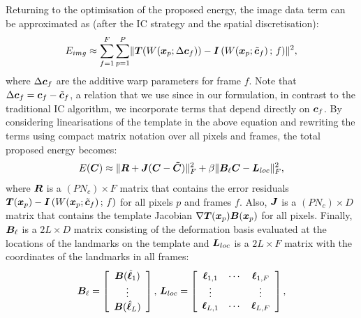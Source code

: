 Returning to the optimisation of the proposed energy, the
image data term can be approximated as (after the IC strategy and the spatial
discretisation):
\begin{equation}
    E_{img} \approx \sum_{f=1}^F \sum_{p=1}^P  \lVert{} 
                                    \boldsymbol{T}(W(\boldsymbol{x}_p;\Delta \boldsymbol{c}_f)) -
                                   \boldsymbol{I}\left( W(\boldsymbol{x}_p;\tilde{\boldsymbol{c}}_f)\,;\, f \right)
                                  \rVert^2,
\end{equation}
where $\Delta \boldsymbol{c}_f$ are the additive warp parameters for frame $f$. 
Note that $\Delta \boldsymbol{c}_f = \boldsymbol{c}_f - \tilde{\boldsymbol{c}}_f$, a relation that we use since
in our formulation, in contrast to the traditional IC algorithm, we incorporate
terms that depend directly on $\boldsymbol{c}_f$.
By considering linearisations of the template in the above equation and rewriting
the terms using compact matrix notation over all pixels and frames, the total
proposed energy becomes:
\begin{equation}\label{E:ENERGY}
    E(\boldsymbol{C}) \approx \lVert{}  \boldsymbol{R} + \boldsymbol{J} (\boldsymbol{C} - \boldsymbol{\tilde{C}})  \rVert_F^2
    + \beta \lVert{} \boldsymbol{B}_\ell \boldsymbol{C} - \boldsymbol{L}_{loc} \rVert_F^2,
\end{equation}
where $\boldsymbol{R}$ is a $(P N_c) \times F$ matrix that contains the error residuals
$\boldsymbol{T}(\boldsymbol{x}_p) - \boldsymbol{I}\left( W(\boldsymbol{x}_p;\tilde{\boldsymbol{c}}_f) \,;\, f \right)$ for all pixels
$p$ and frames $f$. Also,
$\boldsymbol{J}$ is a $(P N_c) \times D$ matrix that contains the template Jacobian
$\nabla\boldsymbol{T}(\boldsymbol{x}_p) \boldsymbol{B}(\boldsymbol{x}_p)$ for all pixels.
Finally, $\boldsymbol{B}_\ell$ is a $2L \times D$ matrix consisting of the deformation
basis evaluated at the locations of the landmarks on the template and
$\boldsymbol{L}_{loc}$ is a $2L\times F$ matrix with the coordinates of the landmarks
in all frames:
\begin{equation}
    \boldsymbol{B}_\ell=
        \left[
            \begin{array}{c}
                \boldsymbol{B}(\hat{\boldsymbol{\ell}}_1) \\
                \vdots \\
                \boldsymbol{B}(\hat{\boldsymbol{\ell}}_L)
            \end{array}
        \right],\,
    \boldsymbol{L}_{loc}=
        \left[
            \begin{array}{ccc}
                \boldsymbol{\ell}_{1,1}&\cdots&\boldsymbol{\ell}_{1,F}
                \\
                \vdots&&\vdots
                \\
                \boldsymbol{\ell}_{L,1}&\cdots&\boldsymbol{\ell}_{L,F}
            \end{array}
        \right],
\end{equation}

